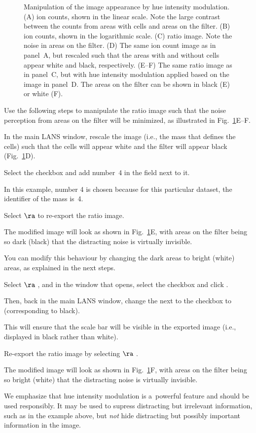 \begin{figure}[!ht]
\begin{tabular}{ccc}
\end{tabular}
\caption{\label{fig:hue}%
Manipulation of the image appearance by hue intensity modulation. (A)  ion counts, shown in the linear scale. Note the large contrast between the counts from areas with cells and areas on the filter. (B)  ion counts, shown in the logarithmic scale. (C)  ratio image. Note the noise in areas on the filter. (D) The same  ion count image as in panel~A, but rescaled such that the areas with and without cells appear white and black, respectively. (E--F) The same  ratio image as in panel~C, but with hue intensity modulation applied based on the image in panel~D. The areas on the filter can be shown in black (E) or white (F).}
\end{figure}

Use the following steps to manipulate the ratio image such that the noise perception from areas on the filter will be minimized, as illustrated in Fig.~\ref{fig:hue}E--F.

\s In the main LANS window, rescale the  image (i.e., the mass that defines the cells) such that the cells will appear white and the filter will appear black (Fig.~\ref{fig:hue}D).

\s Select the  checkbox and add number~4 in the  field next to it. 

\bul In this example, number 4 is chosen because for this particular dataset, the identifier of the  mass is~4. 

\s Select  $\ra$  to re-export the  ratio image.

\bul The modified image will look as shown in Fig.~\ref{fig:hue}E, with areas on the filter being so dark (black) that the distracting noise is virtually invisible.

\bul You can modify this behaviour by changing the dark areas to bright (white) areas, as explained in the next steps.

\s Select  $\ra$ , and in the window that opens, select the  checkbox and click . 

\s Then, back in the main LANS window, change the  next to the  checkbox to  (corresponding to black).

\bul This will ensure that the scale bar will be visible in the exported image (i.e., displayed in black rather than white).

\s Re-export the ratio image by selecting  $\ra$ .

\bul The modified image will look as shown in Fig.~\ref{fig:hue}F, with areas on the filter being so bright (white) that the distracting noise is virtually invisible.

\vskip3mm\noindent
We emphasize that hue intensity modulation is a~powerful feature and should be used responsibly. It may be used to supress distracting but irrelevant information, such as in the example above, but \emph{not} hide distracting but possibly important information in the image.
